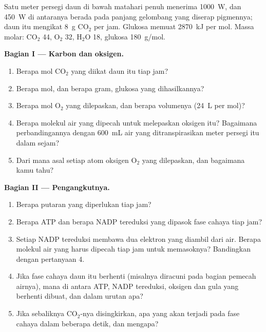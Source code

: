 \begin{problem}
\label{pb:g12:photosynthesis:1}
Satu meter persegi daun di bawah matahari penuh menerima \qty{1000}{W},
dan \qty{450}{W} di antaranya berada pada panjang gelombang yang
diserap pigmennya; daun itu mengikat \qty{8}{g} $\mathrm{CO_2}$ per
jam. Glukosa memuat \qty{2870}{kJ} per mol. Massa molar:
$\mathrm{CO_2}$ 44, $\mathrm{O_2}$ 32, $\mathrm{H_2O}$ 18, glukosa
\qty{180}{g/mol}.

\medskip
\noindent\textbf{Bagian I --- Karbon dan oksigen.}
\begin{enumerate}
  \item Berapa mol $\mathrm{CO_2}$ yang diikat daun itu tiap jam?
  \item Berapa mol, dan berapa gram, glukosa yang dihasilkannya?
  \item Berapa mol $\mathrm{O_2}$ yang dilepaskan, dan berapa
        volumenya (\qty{24}{L} per mol)?
  \item Berapa molekul air yang dipecah untuk melepaskan oksigen itu?
        Bagaimana perbandingannya dengan \qty{600}{mL} air yang
        ditranspirasikan meter persegi itu dalam sejam?
  \item Dari mana asal setiap atom oksigen $\mathrm{O_2}$ yang
        dilepaskan, dan bagaimana kamu tahu?
\end{enumerate}

\medskip
\noindent\textbf{Bagian II --- Pengangkutnya.}
\begin{enumerate}[resume]
  \item Berapa putaran  yang diperlukan tiap jam?
  \item Berapa ATP dan berapa NADP tereduksi yang dipasok fase cahaya
        tiap jam?
  \item Setiap NADP tereduksi membawa dua elektron yang diambil dari
        air. Berapa molekul air yang harus dipecah tiap jam untuk
        memasoknya? Bandingkan dengan pertanyaan 4.
  \item Jika fase cahaya daun itu berhenti (misalnya 
        diracuni pada bagian pemecah airnya), mana di antara ATP, NADP
        tereduksi, oksigen dan gula yang berhenti dibuat, dan dalam
        urutan apa?
  \item Jika sebaliknya $\mathrm{CO_2}$-nya disingkirkan, apa yang akan
        terjadi pada fase cahaya dalam beberapa detik, dan mengapa?
\end{enumerate}


\end{problem}
